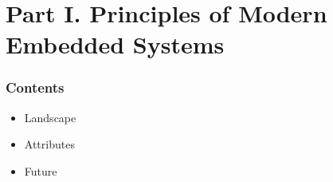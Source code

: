 \section{Part I. Principles of Modern Embedded Systems}

\begin{frame}
  \frametitle{Contents}
  \begin{itemize}
  \item Landscape
  \item Attributes
  \item Future
  \end{itemize}
\end{frame}
